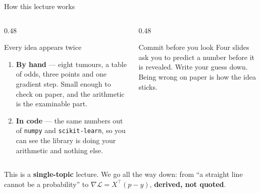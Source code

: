 \documentclass[aspectratio=169]{beamer}
\begin{document}
\begin{frame}[shrink=6]{How this lecture works}
  \begin{columns}[T]
    \begin{column}{0.48\textwidth}
      \begin{block}{Every idea appears twice}
        \begin{enumerate}
          \item \textbf{By hand} --- eight tumours, a table of odds, three
            points and one gradient step. Small enough to check on paper,
            and the arithmetic is the examinable part.
          \item \textbf{In code} --- the same numbers out of
            \texttt{numpy} and \texttt{scikit-learn}, so you can see the
            library is doing your arithmetic and nothing else.
        \end{enumerate}
      \end{block}
    \end{column}
    \begin{column}{0.48\textwidth}
      \begin{alertblock}{Commit before you look}
        Four slides ask you to predict a number before it is revealed.
        Write your guess down. Being wrong on paper is how the idea sticks.
      \end{alertblock}
    \end{column}
  \end{columns}
  \vspace{0.4em}
  \begin{center}
    \small This is a \textbf{single-topic} lecture. We go all the way down:
    from ``a straight line cannot be a probability'' to
    $\nabla\mathcal{L} = X^{\!\top}(p - y)$, \textbf{derived, not quoted}.
  \end{center}
\end{frame}
\end{document}
